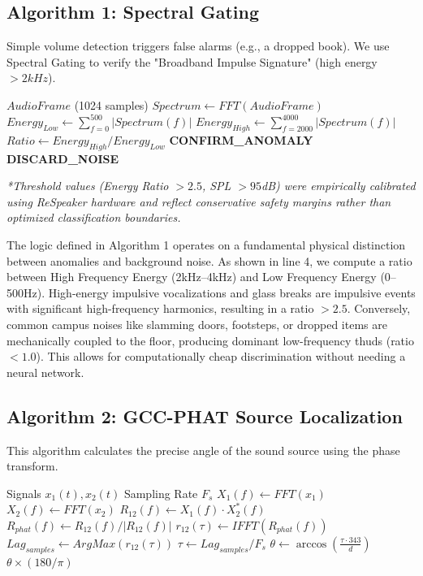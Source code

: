 \documentclass[conference]{IEEEtran}
\begin{document}
\subsection{Algorithm 1: Spectral Gating}
Simple volume detection triggers false alarms (e.g., a dropped book). We use Spectral Gating to verify the "Broadband Impulse Signature" (high energy $>2kHz$).

\begin{algorithm}
\caption{Spectral Gating for Anomaly Verification}
\begin{algorithmic}[1]
\REQUIRE $AudioFrame$ (1024 samples)
\STATE $Spectrum \gets FFT(AudioFrame)$
\STATE $Energy_{Low} \gets \sum_{f=0}^{500} |Spectrum(f)|$ 
\STATE $Energy_{High} \gets \sum_{f=2000}^{4000} |Spectrum(f)|$ 
\STATE $Ratio \gets Energy_{High} / Energy_{Low}$
    \STATE \textbf{CONFIRM\_ANOMALY}
\ELSE
    \STATE \textbf{DISCARD\_NOISE}
\ENDIF
\end{algorithmic}
\label{alg:gating}
\end{algorithm}

\textit{*Threshold values (Energy Ratio $>2.5$, SPL $>95$dB) were empirically calibrated using ReSpeaker hardware and reflect conservative safety margins rather than optimized classification boundaries.}

\vspace{0.3cm}

The logic defined in Algorithm 1 operates on a fundamental physical distinction between anomalies and background noise. As shown in line 4, we compute a ratio between High Frequency Energy (2kHz–4kHz) and Low Frequency Energy (0–500Hz). High-energy impulsive vocalizations and glass breaks are impulsive events with significant high-frequency harmonics, resulting in a ratio $>2.5$. Conversely, common campus noises like slamming doors, footsteps, or dropped items are mechanically coupled to the floor, producing dominant low-frequency thuds (ratio $<1.0$). This allows for computationally cheap discrimination without needing a neural network.

\subsection{Algorithm 2: GCC-PHAT Source Localization}
This algorithm calculates the precise angle of the sound source using the phase transform.

\begin{algorithm}
\caption{GCC-PHAT Source Localization}
\begin{algorithmic}[1]
\REQUIRE Signals $x_1(t), x_2(t)$
\REQUIRE Sampling Rate $F_s$
\STATE $X_1(f) \gets FFT(x_1)$
\STATE $X_2(f) \gets FFT(x_2)$
\STATE $R_{12}(f) \gets X_1(f) \cdot X_2^*(f)$ 
\STATE $R_{phat}(f) \gets R_{12}(f) / |R_{12}(f)|$ 
\STATE $r_{12}(\tau) \gets IFFT(R_{phat}(f))$
\STATE $Lag_{samples} \gets ArgMax(r_{12}(\tau))$
\STATE $\tau \gets Lag_{samples} / F_s$
\STATE $\theta \gets \arccos(\frac{\tau \cdot 343}{d})$
\RETURN $\theta \times (180/\pi)$
\end{algorithmic}
\label{alg:tdoa_code}
\end{algorithm}
\end{document}
